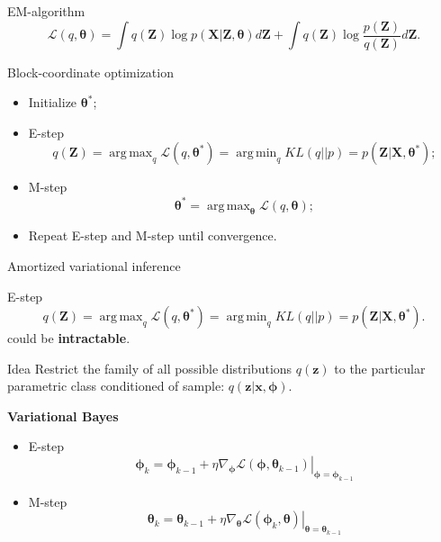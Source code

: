 \documentclass{beamer}
\newcommand{\bx}{\mathbf{x}}
\newcommand{\bz}{\mathbf{z}}
\newcommand{\bX}{\mathbf{X}}
\newcommand{\bZ}{\mathbf{Z}}
\newcommand{\btheta}{\boldsymbol{\theta}}
\newcommand{\bphi}{\boldsymbol{\phi}}
\DeclareMathOperator*{\argmin}{arg\,min}
\DeclareMathOperator*{\argmax}{arg\,max}
\begin{document}
\begin{frame}{EM-algorithm}
	\[
		\mathcal{L} (q, \btheta)  = \int q(\bZ) \log p(\bX | \bZ, \btheta) d\bZ + \int q(\bZ) \log \frac{p(\bZ)}{q(\bZ)}d\bZ.
	\]
	\begin{block}{Block-coordinate optimization}
	\begin{itemize}
		\item Initialize $\btheta^*$;
		\item E-step
		\[
			q(\bZ) = \argmax_q \mathcal{L} (q, \btheta^*) = \argmin_q KL(q || p) =
			 p(\bZ| \bX, \btheta^*);
		\]
		\item M-step
		\[
			\btheta^* = \argmax_{\btheta} \mathcal{L} (q, \btheta);
		\]
		\item Repeat E-step and M-step until convergence.
	\end{itemize}
	\end{block}
\end{frame}
\begin{frame}{Amortized variational inference}
    \begin{block}{E-step}
    \vspace{-0.3cm}
    \[
		q(\bZ) = \argmax_q \mathcal{L} (q, \btheta^*) = \argmin_q KL(q || p) =
		 p(\bZ| \bX, \btheta^*).
	\]
	could be \textbf{intractable}.
    \end{block}
	\begin{block}{Idea}
	Restrict the family of all possible distributions $q(\bz)$ to the particular parametric class conditioned of sample: $q(\bz|\bx, \bphi)$.
	\end{block}
	
	\textbf{Variational Bayes}
	\begin{itemize}
		\item E-step
		\[
		\bphi_k = \bphi_{k-1} + \left.\eta \nabla_{\bphi} \mathcal{L}(\bphi, \btheta_{k-1})\right|_{\bphi=\bphi_{k-1}}
		\]
		\item M-step
		\[
		\btheta_k = \btheta_{k-1} + \left.\eta \nabla_{\btheta} \mathcal{L}(\bphi_k, \btheta)\right|_{\btheta=\btheta_{k-1}}
		\]
	\end{itemize}
\end{frame}
\end{document}
